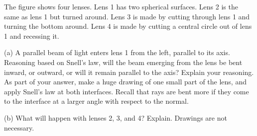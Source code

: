 The figure shows four lenses. Lens 1 has two spherical
surfaces. Lens 2 is the same as lens 1 but turned around.
Lens 3 is made by cutting through lens 1 and turning the
bottom around. Lens 4 is made by cutting a central circle
out of lens 1 and recessing it.

(a) A parallel beam of light enters lens 1 from the left,
parallel to its axis. Reasoning based on Snell's law, will
the beam emerging from the lens be bent inward, or outward,
or will it remain parallel to the axis? Explain your
reasoning. As part of your answer, make a huge
drawing of one small part of the lens, and apply Snell's law
at both interfaces. Recall that rays are bent more if they
come to the interface at a larger angle with respect to the normal.

(b) What will happen with lenses 2, 3, and 4? Explain.
Drawings are not necessary.
